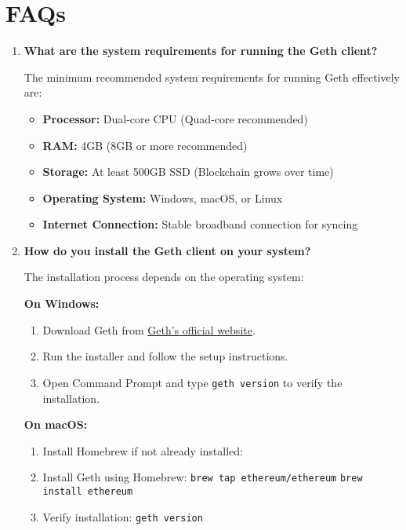 \documentclass[11pt]{article}
\begin{document}
\section{FAQs}

\begin{enumerate}
    \item \textbf{What are the system requirements for running the Geth client?}
    
    The minimum recommended system requirements for running Geth effectively are:
    \begin{itemize}
        \item \textbf{Processor:} Dual-core CPU (Quad-core recommended)
        \item \textbf{RAM:} 4GB (8GB or more recommended)
        \item \textbf{Storage:} At least 500GB SSD (Blockchain grows over time)
        \item \textbf{Operating System:} Windows, macOS, or Linux
        \item \textbf{Internet Connection:} Stable broadband connection for syncing
    \end{itemize}

    \item \textbf{How do you install the Geth client on your system?}
    
    The installation process depends on the operating system:
    
    \textbf{On Windows:}
    \begin{enumerate}
        \item Download Geth from \href{https://geth.ethereum.org/downloads}{Geth's official website}.
        \item Run the installer and follow the setup instructions.
        \item Open Command Prompt and type \texttt{geth version} to verify the installation.
    \end{enumerate}

    \textbf{On macOS:}
    \begin{enumerate}
        \item Install Homebrew if not already installed:  
        \item Install Geth using Homebrew:  
        \texttt{brew tap ethereum/ethereum}  
        \texttt{brew install ethereum}
        \item Verify installation: \texttt{geth version}
    \end{enumerate}


\end{enumerate}
\end{document}
